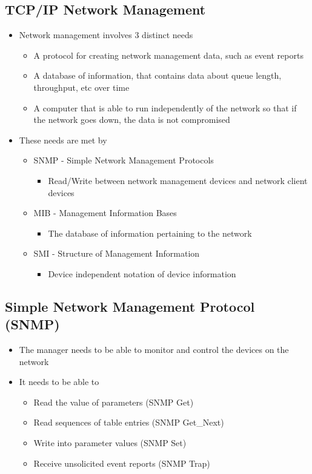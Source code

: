 \subsection*{TCP/IP Network Management}

\begin{itemize}
  \item Network management involves 3 distinct needs
  \begin{itemize}
    \item A protocol for creating network management data, such as event reports
    \item A database of information, that contains data about queue length, throughput, etc over time
    \item A computer that is able to run independently of the network so that if the network goes down, the data is not compromised
  \end{itemize}
  \item These needs are met by
  \begin{itemize}
    \item SNMP - Simple Network Management Protocols
    \begin{itemize}
      \item Read/Write between network management devices and network client devices
    \end{itemize}
    \item MIB - Management Information Bases
    \begin{itemize}
      \item The database of information pertaining to the network
    \end{itemize}
    \item SMI - Structure of Management Information
    \begin{itemize}
      \item Device independent notation of device information
    \end{itemize}
  \end{itemize}
\end{itemize}

\subsection*{Simple Network Management Protocol (SNMP)}

\begin{itemize}
  \item The manager needs to be able to monitor and control the devices on the network
  \item It needs to be able to
  \begin{itemize}
    \item Read the value of parameters (SNMP Get)
    \item Read sequences of table entries (SNMP Get\_Next)
    \item Write into parameter values (SNMP Set)
    \item Receive unsolicited event reports (SNMP Trap)
  \end{itemize}
\end{itemize}

